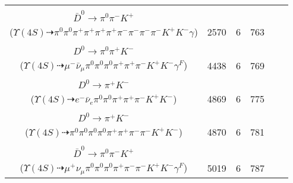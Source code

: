 \documentclass[landscape]{article}
\newcounter{rownumbers}
\newcommand\rn{\stepcounter{rownumbers}\arabic{rownumbers}}
\newcommand{\EOLP}{\\ \hline} %
\newcommand{\topoTags}[1]{#1} %
\begin{document}
\begin{longtable}{clcccc}
\rn & \makecell[l]{ $ 
\Upsilon(4S) \rightarrow B^{+} B^{-} ,
B^{+} \rightarrow \pi^{+} \pi^{+} \pi^{+} \pi^{-} \pi^{-} \bar{D}^{*0} ,
B^{-} \rightarrow \rho^{-} D^{0} ,
\bar{D}^{*0} \rightarrow \bar{D}^{0} \gamma ,
\rho^{-} \rightarrow \pi^{0} \pi^{-} ,
D^{0} \rightarrow \pi^{+} K^{-} ,
$ \\ $
\bar{D}^{0} \rightarrow \pi^{0} \pi^{-} K^{+} 
$ \\ ($
\Upsilon(4S) \dashrightarrow \pi^{0} \pi^{0} \pi^{+} \pi^{+} \pi^{+} \pi^{+} \pi^{-} \pi^{-} \pi^{-} \pi^{-} K^{+} K^{-} \gamma 
$) } & \topoTags{2570 & }6 & 763 \EOLP

\rn & \makecell[l]{ $ 
\Upsilon(4S) \rightarrow B^{+} B^{-} ,
B^{+} \rightarrow \rho^{+} \bar{D}^{0} ,
B^{-} \rightarrow \mu^{-} \bar{\nu}_{\mu} D^{*0} ,
\rho^{+} \rightarrow \pi^{0} \pi^{+} ,
\bar{D}^{0} \rightarrow \pi^{-} K^{+} \gamma^{F} ,
D^{*0} \rightarrow \pi^{0} D^{0} ,
$ \\ $
D^{0} \rightarrow \pi^{0} \pi^{+} K^{-} 
$ \\ ($
\Upsilon(4S) \dashrightarrow \mu^{-} \bar{\nu}_{\mu} \pi^{0} \pi^{0} \pi^{0} \pi^{+} \pi^{+} \pi^{-} K^{+} K^{-} \gamma^{F} 
$) } & \topoTags{4438 & }6 & 769 \EOLP

\rn & \makecell[l]{ $ 
\Upsilon(4S) \rightarrow B^{+} B^{-} ,
B^{+} \rightarrow \rho^{+} \bar{D}^{0} ,
B^{-} \rightarrow e^{-} \bar{\nu}_{e} D^{*0} ,
\rho^{+} \rightarrow \pi^{0} \pi^{+} ,
\bar{D}^{0} \rightarrow \pi^{-} K^{+} ,
D^{*0} \rightarrow \pi^{0} D^{0} ,
$ \\ $
D^{0} \rightarrow \pi^{+} K^{-} 
$ \\ ($
\Upsilon(4S) \dashrightarrow e^{-} \bar{\nu}_{e} \pi^{0} \pi^{0} \pi^{+} \pi^{+} \pi^{-} K^{+} K^{-} 
$) } & \topoTags{4869 & }6 & 775 \EOLP

\rn & \makecell[l]{ $ 
\Upsilon(4S) \rightarrow B^{+} B^{-} ,
B^{+} \rightarrow \pi^{0} \rho^{+} \bar{D}^{0} ,
B^{-} \rightarrow \rho^{-} D^{0} ,
\rho^{+} \rightarrow \pi^{0} \pi^{+} ,
\bar{D}^{0} \rightarrow \pi^{0} \pi^{-} K^{+} ,
\rho^{-} \rightarrow \pi^{0} \pi^{-} ,
$ \\ $
D^{0} \rightarrow \pi^{+} K^{-} 
$ \\ ($
\Upsilon(4S) \dashrightarrow \pi^{0} \pi^{0} \pi^{0} \pi^{0} \pi^{+} \pi^{+} \pi^{-} \pi^{-} K^{+} K^{-} 
$) } & \topoTags{4870 & }6 & 781 \EOLP

\rn & \makecell[l]{ $ 
\Upsilon(4S) \rightarrow B^{+} B^{-} ,
B^{+} \rightarrow \mu^{+} \nu_{\mu} \bar{D}^{*0} \gamma^{F} ,
B^{-} \rightarrow \rho^{-} D^{0} ,
\bar{D}^{*0} \rightarrow \pi^{0} \bar{D}^{0} ,
\rho^{-} \rightarrow \pi^{0} \pi^{-} ,
D^{0} \rightarrow \pi^{+} K^{-} ,
$ \\ $
\bar{D}^{0} \rightarrow \pi^{0} \pi^{-} K^{+} 
$ \\ ($
\Upsilon(4S) \dashrightarrow \mu^{+} \nu_{\mu} \pi^{0} \pi^{0} \pi^{0} \pi^{+} \pi^{-} \pi^{-} K^{+} K^{-} \gamma^{F} 
$) } & \topoTags{5019 & }6 & 787 \EOLP


\end{longtable}
\end{document}
